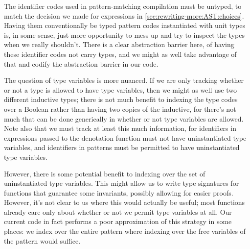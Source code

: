 The identifier codes used in pattern-matching compilation must be untyped, to match the decision we made for expressions in \autoref{sec:rewriting-more:AST:choices}.
Having them conventionally be typed pattern codes instantiated with unit types is, in some sense, just more opportunity to mess up and try to inspect the types when we really shouldn't.
There is a clear abstraction barrier here, of having these identifier codes not carry types, and we might as well take advantage of that and codify the abstraction barrier in our code.

The question of type variables is more nuanced.
If we are only tracking whether or not a type is allowed to have type variables, then we might as well use two different inductive types; there is not much benefit to indexing the type codes over a Boolean rather than having two copies of the inductive, for there's not much that can be done generically in whether or not type variables are allowed.
Note also that we must track at least this much information, for identifiers in expressions passed to the denotation function must not have uninstantiated type variables, and identifiers in patterns must be permitted to have uninstantiated type variables.

However, there is some potential benefit to indexing over the set of uninstantiated type variables.
This might allow us to write type signatures for functions that guarantee some invariants, possibly allowing for easier proofs.
However, it's not clear to us where this would actually be useful; most functions already care only about whether or not we permit type variables at all.
Our current code in fact performs a poor approximation of this strategy in some places: we index over the entire pattern where indexing over the free variables of the pattern would suffice.

